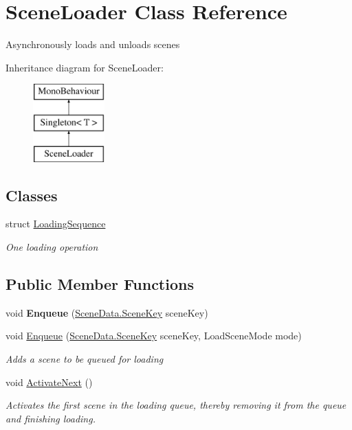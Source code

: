 \hypertarget{class_scene_loader}{\section{Scene\-Loader Class Reference}
\label{class_scene_loader}
}


Asynchronously loads and unloads scenes  


Inheritance diagram for Scene\-Loader\-:\begin{figure}[H]
\begin{center}
\leavevmode
\includegraphics[height=3.000000cm]{class_scene_loader}
\end{center}
\end{figure}
\subsection*{Classes}
\begin{DoxyCompactItemize}
\item 
struct \hyperlink{struct_scene_loader_1_1_loading_sequence}{Loading\-Sequence}
\begin{DoxyCompactList}\small\item\em One loading operation \end{DoxyCompactList}\end{DoxyCompactItemize}
\subsection*{Public Member Functions}
\begin{DoxyCompactItemize}
\item 
\hypertarget{class_scene_loader_a9e0efaf19ed0a6ffbf11a8372794ea56}{void {\bfseries Enqueue} (\hyperlink{class_scene_data_a79d397b3deef242a865470283d96f2e6}{Scene\-Data.\-Scene\-Key} scene\-Key)}\label{class_scene_loader_a9e0efaf19ed0a6ffbf11a8372794ea56}

\item 
void \hyperlink{class_scene_loader_a2aed11331afc72fc9437dcadb62c67dc}{Enqueue} (\hyperlink{class_scene_data_a79d397b3deef242a865470283d96f2e6}{Scene\-Data.\-Scene\-Key} scene\-Key, Load\-Scene\-Mode mode)
\begin{DoxyCompactList}\small\item\em Adds a scene to be queued for loading \end{DoxyCompactList}\item 
void \hyperlink{class_scene_loader_a8d34c08688d084324ae9c3f52c1a7c18}{Activate\-Next} ()
\begin{DoxyCompactList}\small\item\em Activates the first scene in the loading queue, thereby removing it from the queue and finishing loading. \end{DoxyCompactList}\end{DoxyCompactItemize}
